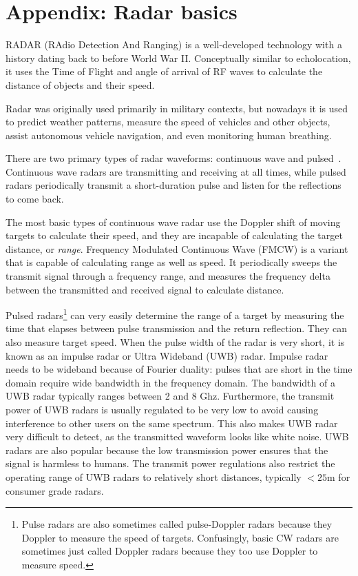 \documentclass[12pt]{article}
\begin{document}

\begin{footnotesize}
  
\end{footnotesize}

\section*{Appendix: Radar basics}
RADAR (RAdio Detection And Ranging) is a well-developed technology
with a history dating back to before World War II. Conceptually
similar to echolocation, it uses the Time of Flight and angle of
arrival of RF waves to calculate the distance of objects and their
speed.

Radar was originally used primarily in military contexts, but nowadays
it is used to predict weather patterns, measure the speed of vehicles
and other objects, assist autonomous vehicle navigation, and even
monitoring human breathing.

There are two primary types of radar waveforms: continuous wave and
pulsed~\cite{Richards2010}. Continuous wave radars are transmitting
and receiving at all times, while pulsed radars periodically transmit a
short-duration pulse and listen for the reflections to come back.

The most basic types of continuous wave radar use the Doppler shift of
moving targets to calculate their speed, and they are incapable of
calculating the target distance, or \emph{range}. Frequency Modulated
Continuous Wave (FMCW) is a variant that is capable of calculating
range as well as speed. It periodically sweeps the transmit signal
through a frequency range, and measures the frequency delta between
the transmitted and received signal to calculate distance.

Pulsed radars\footnote{Pulse radars are also sometimes called
  pulse-Doppler radars because they Doppler to measure the speed of
  targets. Confusingly, basic CW radars are sometimes just called
  Doppler radars because they too use Doppler to measure speed.} can
very easily determine the range of a target by measuring the time that
elapses between pulse transmission and the return reflection. They can
also measure target speed. When the pulse width of the radar is very
short, it is known as an impulse radar or Ultra Wideband (UWB)
radar. Impulse radar needs to be wideband because of Fourier duality:
pulses that are short in the time domain require wide bandwidth in the
frequency domain. The bandwidth of a UWB radar typically ranges
between 2 and 8 Ghz. Furthermore, the transmit power of UWB radars is
usually regulated to be very low to avoid causing interference to
other users on the same spectrum. This also makes UWB radar very
difficult to detect, as the transmitted waveform looks like white
noise. UWB radars are also popular because the low transmission power
ensures that the signal is harmless to humans. The transmit power
regulations also restrict the operating range of UWB radars to
relatively short distances, typically $<25$m for consumer grade radars.
\end{document}
